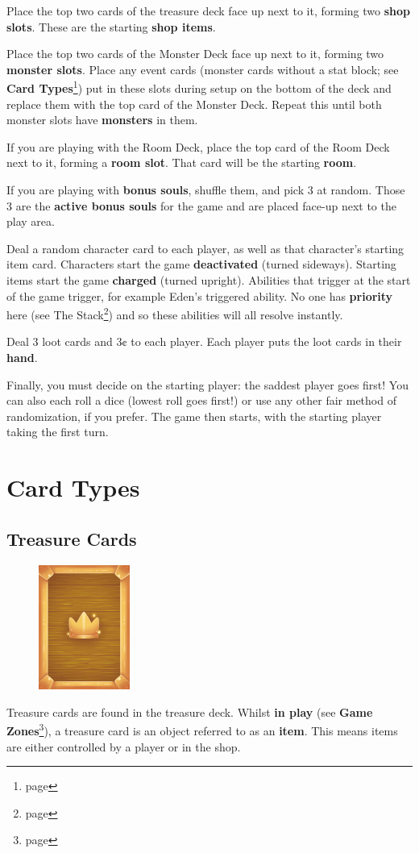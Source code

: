 \documentclass[a4paper, twoside]{report} %
\begin{document}
    Place the top two cards of the treasure deck face up next to it, forming two \textbf{shop slots}. These are the starting \textbf{shop items}.

    Place the top two cards of the Monster Deck face up next to it, forming two \textbf{monster slots}. Place any event cards (monster cards without a stat block; see \textbf{Card Types}\footnote{page \pageref{types}}) put in these slots during setup on the bottom of the deck and replace them with the top card of the Monster Deck. Repeat this until both monster slots have \textbf{monsters} in them.

    If you are playing with the Room Deck, place the top card of the Room Deck next to it, forming a \textbf{room slot}. That card will be the starting \textbf{room}.

    If you are playing with \textbf{bonus souls}, shuffle them, and pick 3 at random. Those 3 are the \textbf{active bonus souls} for the game and are placed face-up next to the play area.

    Deal a random character card to each player, as well as that character’s starting item card. Characters start the game \textbf{deactivated} (turned sideways). Starting items start the game \textbf{charged} (turned upright). Abilities that trigger at the start of the game trigger, for example Eden’s triggered ability. No one has \textbf{priority} here (see The Stack\footnote{page \pageref{stack}}) and so these abilities will all resolve instantly.

    Deal 3 loot cards and 3¢ to each player. Each player puts the loot cards in their \textbf{hand}.

    Finally, you must decide on the starting player: the saddest player goes first! You can also each roll a dice (lowest roll goes first!) or use any other fair method of randomization, if you prefer. The game then starts, with the starting player taking the first turn.

    \chapter{Card Types}
    \label{types}
    \section{Treasure Cards}
    \begin{figure}
        \centering
        \includegraphics[width=30mm]{assets/treasure.png}
    \end{figure}
    Treasure cards are found in the treasure deck. Whilst \textbf{in play} (see \textbf{Game Zones}\footnote{page \pageref{zones}}), a treasure card is an object referred to as an \textbf{item}. This means items are either controlled by a player or in the shop.
  
\end{document}
